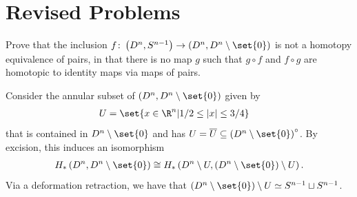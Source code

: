 \documentclass[10pt]{mypackage}
\begin{document}
\RaggedRight
\section{Revised Problems}%
\begin{problem}
  Prove that the inclusion $f\colon \left( D^n,S^{n-1} \right)\rightarrow \left( D^n,D^n\setminus\set{0} \right)$ is not a homotopy equivalence of pairs, in that there is no map $g$ such that $g\circ f$ and $f\circ g$ are homotopic to identity maps via maps of pairs.
\end{problem}
\begin{solution}
  Consider the annular subset of $\left( D^n,D^n\setminus\set{0} \right)$ given by
  \begin{align*}
    U &= \set{x\in \R^{n} | 1/2\leq \left\vert x \right\vert\leq 3/4}
  \end{align*}
  that is contained in $D^n\setminus\set{0}$ and has $U = \overline{U}\subseteq \left( D^n\setminus\set{0} \right)^{\circ}$. By excision, this induces an isomorphism
  \begin{align*}
    H_{\ast}\left( D^n,D^n\setminus\set{0} \right)\cong H_{\ast}\left( D^n\setminus U,\left( D^n\setminus \set{0} \right)\setminus U \right).
  \end{align*}
  Via a deformation retraction, we have that $\left( D^n\setminus \set{0} \right)\setminus U\simeq S^{n-1}\sqcup S^{n-1}$.


\end{solution}
\end{document}
